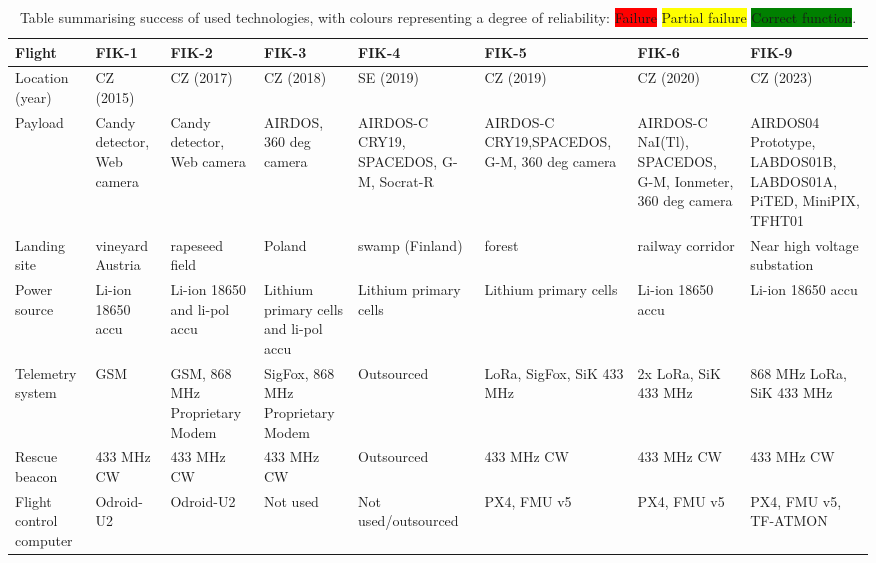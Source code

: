 \documentclass[a4paper,landscape]{article}
\begin{document}
\begin{table*}
\centering
\caption{Table summarising success of used technologies, with colours representing a degree of reliability: \newline \colorbox{red}{Failure} \colorbox{yellow}{Partial failure} \colorbox{green}{Correct function}.\label{Flight_reliability}}
\begin{adjustbox}{width=\textwidth} %
{\begin{tabular}{>{\centering\arraybackslash}m{} >{\centering\arraybackslash}m{} >{\centering\arraybackslash}m{} >{\centering\arraybackslash}m{} >{\centering\arraybackslash}m{} >{\centering\arraybackslash}m{} >{\centering\arraybackslash}m{} >{\centering\arraybackslash}m{}}\toprule
Flight & FIK-1 & FIK-2 & FIK-3 & FIK-4 & FIK-5 & FIK-6 & FIK-9 \\\midrule
Location (year) & CZ (2015) & CZ (2017) & CZ (2018) & SE (2019) & CZ (2019) & CZ (2020) & CZ (2023) \\
Payload & \cellcolor{green} Candy detector, Web camera & \cellcolor{yellow} Candy detector, Web camera & \cellcolor{green} AIRDOS,
360 deg camera & \cellcolor{green} AIRDOS-C CRY19, SPACEDOS, G-M, Socrat-R & \cellcolor{green} AIRDOS-C
CRY19,SPACEDOS, G-M, 360 deg camera & \cellcolor{green} AIRDOS-C NaI(Tl), SPACEDOS, G-M, Ionmeter, 360 deg camera & \cellcolor{green} AIRDOS04 Prototype, LABDOS01B, LABDOS01A, PiTED, MiniPIX, TFHT01 \\
Landing site & \cellcolor{yellow} vineyard Austria & \cellcolor{green} rapeseed field & \cellcolor{red} Poland & \cellcolor{yellow} swamp (Finland) & \cellcolor{green} forest & \cellcolor{red} railway corridor & \cellcolor{red} Near high voltage substation\\
Power source & \cellcolor{green} Li-ion 18650 accu & \cellcolor{yellow} Li-ion 18650 and li-pol accu & \cellcolor{yellow} Lithium primary cells and li-pol accu & \cellcolor{green} Lithium primary cells & \cellcolor{yellow} Lithium primary cells & \cellcolor{green} Li-ion 18650 accu &  \cellcolor{green} Li-ion 18650 accu \\
Telemetry system & \cellcolor{red} GSM & \cellcolor{yellow} GSM, 868 MHz Proprietary Modem & \cellcolor{yellow} SigFox, 868 MHz Proprietary Modem &  Outsourced & \cellcolor{green} LoRa, SigFox, SiK 433 MHz & \cellcolor{green} 2x LoRa, SiK 433 MHz & \cellcolor{green} 868 MHz LoRa, SiK 433 MHz \\
Rescue beacon & \cellcolor{green} 433 MHz CW & \cellcolor{green} 433 MHz CW & \cellcolor{green} 433 MHz CW &  Outsourced & \cellcolor{green} 433 MHz CW & \cellcolor{green} 433 MHz CW & \cellcolor{green} 433 MHz CW \\
Flight control computer & \cellcolor{yellow} Odroid-U2 & \cellcolor{yellow} Odroid-U2 & Not used & Not used/outsourced & \cellcolor{green} PX4, FMU v5 & \cellcolor{green} PX4, FMU v5 & \cellcolor{green} PX4, FMU v5, TF-ATMON \\
\bottomrule
\end{tabular}}
\end{adjustbox}
\end{table*}
\end{document}
